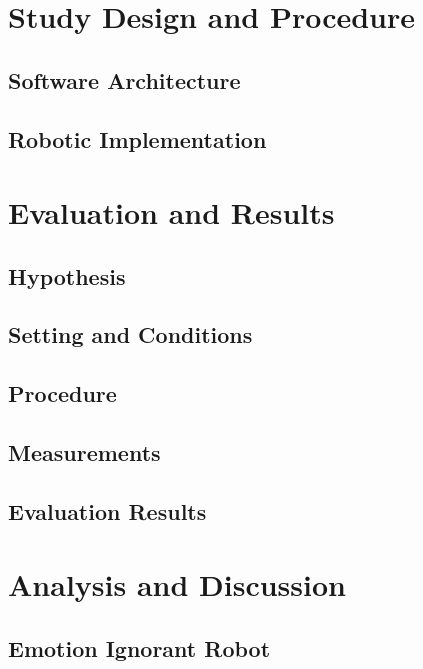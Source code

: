 \documentclass{sig-alternate-05-2015}
\begin{document}
\section{Study Design and Procedure}

\subsection{Software Architecture}

\subsection{Robotic Implementation}




\section{Evaluation and Results}

\subsection{Hypothesis}

\subsection{Setting and Conditions}

\subsection{Procedure}

\subsection{Measurements}

\subsection{Evaluation Results}




\section{Analysis and Discussion}

\subsection{Emotion Ignorant Robot}
\end{document}
